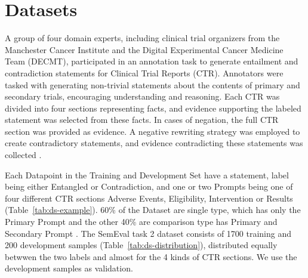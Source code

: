 \section{Datasets}\label{sec:dataset}

A group of four domain experts, including clinical trial organizers from the Manchester Cancer Institute and the 
Digital Experimental Cancer Medicine Team (DECMT), participated in an annotation task to generate entailment and contradiction 
statements for Clinical Trial Reports (CTR). Annotators were tasked with generating non-trivial statements about the contents of primary and 
secondary trials, encouraging understanding and reasoning. Each CTR was divided into four sections representing facts, and 
evidence supporting the labeled statement was selected from these facts. In cases of negation, the full CTR section was 
provided as evidence. A negative rewriting strategy was employed to create contradictory statements, and evidence contradicting 
these statements was collected \cite{jullien_semeval-2023_nodate} \cite{noauthor_nli4ct_nodate}.

Each Datapoint in the Training and Development Set have a statement, label being either Entangled or Contradiction, and one or two Prompts being
one of four different CTR sections Adverse Events, Eligibility, Intervention or Results (Table~\ref{tab:ds-example}). 
60\% of the Dataset are single type, which has only the Primary Prompt and the other 40\% are comparison 
type has Primary and Secondary Prompt \cite{noauthor_nli4ct_nodate}\cite{jullien_nli4ct_2023}\cite{jullien_semeval-2023_nodate}.
The SemEval task 2 dataset consists of 1700 training and 200 development samples (Table~\ref{tab:ds-distribution}),
distributed equally betwwen the two labels and almost for the 4 kinds of CTR sections. We use the development samples
as validation.

